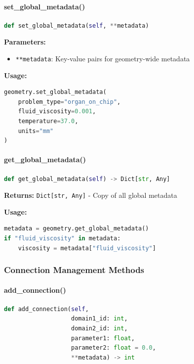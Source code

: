 \paragraph{set\_global\_metadata()}\leavevmode
\begin{lstlisting}[language=Python, caption=Set Global Metadata Method]
def set_global_metadata(self, **metadata)
\end{lstlisting}

\textbf{Parameters:}
\begin{itemize}
    \item \texttt{**metadata}: Key-value pairs for geometry-wide metadata
\end{itemize}

\textbf{Usage:}
\begin{lstlisting}[language=Python]
geometry.set_global_metadata(
    problem_type="organ_on_chip",
    fluid_viscosity=0.001,
    temperature=37.0,
    units="mm"
)
\end{lstlisting}

\paragraph{get\_global\_metadata()}\leavevmode
\begin{lstlisting}[language=Python, caption=Get Global Metadata Method]
def get_global_metadata(self) -> Dict[str, Any]
\end{lstlisting}

\textbf{Returns:} \texttt{Dict[str, Any]} - Copy of all global metadata

\textbf{Usage:}
\begin{lstlisting}[language=Python]
metadata = geometry.get_global_metadata()
if "fluid_viscosity" in metadata:
    viscosity = metadata["fluid_viscosity"]
\end{lstlisting}

\subsubsection{Connection Management Methods}

\paragraph{add\_connection()}\leavevmode
\begin{lstlisting}[language=Python, caption=Add Connection Method]
def add_connection(self,
                   domain1_id: int,
                   domain2_id: int,
                   parameter1: float,
                   parameter2: float = 0.0,
                   **metadata) -> int
\end{lstlisting}

